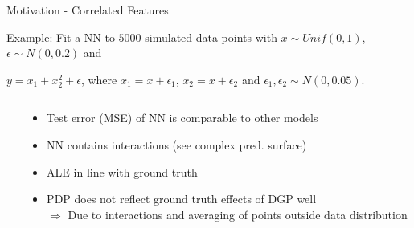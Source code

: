 \documentclass[11pt,compress,t,notes=noshow, aspectratio=169, xcolor=table]{beamer}
\newcommand{\pathiml}{../../slides/03_feature-effects/}
\begin{document}
\begin{frame}{Motivation - Correlated Features}


Example: Fit a NN to $5000$ simulated data points with $x \sim Unif(0,1)$, $\epsilon \sim N(0, 0.2)$ and

\centerline{$y = x_1 + x_2^2 + \epsilon$, where
$x_1 = x + \epsilon_1$, 
$x_2 = x + \epsilon_2$ and $\epsilon_1, \epsilon_2 \sim N(0, 0.05)$.}

\begin{columns}[T]
\begin{column}{0.65\textwidth}
\centering
{}
\end{column}
\begin{column}{0.35\textwidth}

\begin{itemize}
\item Test error (MSE) of NN is comparable to other models
\item NN contains interactions (see complex pred. surface)
\item<2> ALE in line with ground truth
\item<2> PDP does not reflect ground truth effects of DGP well \\
$\Rightarrow$ Due to interactions and averaging of points outside data distribution
\end{itemize}

\end{column}
\end{columns}

\end{frame}
\end{document}
